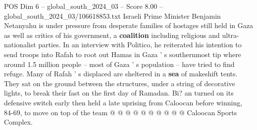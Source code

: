 \begin{textsample}{POS Dim 6 – global\_south\_2024\_03 – Score 8.00 – global\_south\_2024\_03/106618853.txt}
Israeli Prime Minister Benjamin Netanyahu is under pressure from desperate families of hostages still held in Gaza as well as critics of his government, a \textbf{coalition} including religious and ultra-nationalist parties.
In an interview with Politico, he reiterated his intention to send troops into Rafah to root out Hamas in Gaza ' s southernmost tip where around 1.5 million people -- most of Gaza ' s population -- have tried to find refuge.
Many of Rafah ' s displaced are sheltered in a \textbf{sea} of makeshift tents.
They sat on the ground between the structures, under a string of decorative lights, to break their fast on the first day of Ramadan.
Bi? an turned on its defensive switch early then held a late uprising from Caloocan before winning, 84-69, to move on top of the team @ @ @ @ @ @ @ @ @ @ Caloocan Sports Complex.

\end{textsample}
